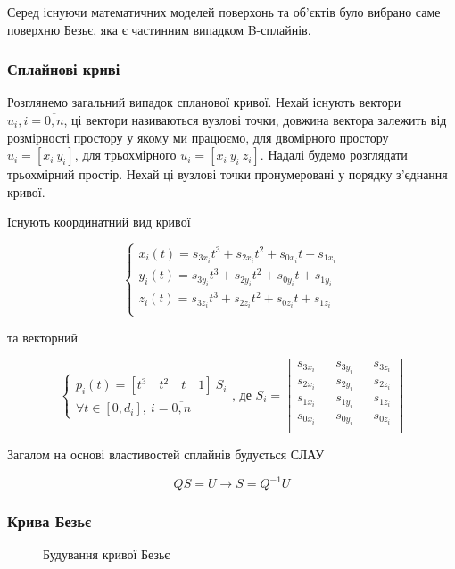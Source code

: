\documentclass[14pt,a4paper]{extarticle}
\theoremstyle{definition}
\renewcommand{\[}{\begin{singlespace}\begin{equation*}}
\renewcommand{\]}{\end{equation*}\end{singlespace}}
\begin{document}
Серед існуючи математичних моделей поверхонь та об'єктів було вибрано саме поверхню Безьє, яка є частинним випадком B-сплайнів.

\subsubsection{Сплайнові криві}

Розглянемо загальний випадок спланової кривої. Нехай існують вектори $u_i, i=\overline{0,n}$, ці вектори називаються вузлові точки, довжина вектора залежить від розмірності простору у якому ми працюємо, для двомірного простору $u_i = [x_i\ y_i]$, для трьохмірного $u_i = [x_i\ y_i\ z_i]$. Надалі будемо розглядати трьохмірний простір. Нехай ці вузлові точки пронумеровані у порядку з'єднання кривої.

Існують координатний вид кривої
\[\left\{\begin{array}{l}
x_i(t)=s_{3x_i}t^3+s_{2x_i}t^2+s_{0x_i}t+s_{1x_i}\\
y_i(t)=s_{3y_i}t^3+s_{2y_i}t^2+s_{0y_i}t+s_{1y_i}\\
z_i(t)=s_{3z_i}t^3+s_{2z_i}t^2+s_{0z_i}t+s_{1z_i}\\
\end{array}\right.\]
та векторний
\[\left\{\begin{array}{l}
p_i(t)=[t^3\quad t^2\quad t\quad 1]\ S_i\\
\forall t \in [0, d_i],\ i = \overline{0,n}
\end{array}\right.\text{, де }S_i=\left[\begin{matrix}
s_{3x_i} && s_{3y_i} && s_{3z_i} \\
s_{2x_i} && s_{2y_i} && s_{2z_i} \\
s_{1x_i} && s_{1y_i} && s_{1z_i} \\
s_{0x_i} && s_{0y_i} && s_{0z_i} \\
\end{matrix}\right]\]

Загалом на основі властивостей сплайнів будується СЛАУ
\[QS=U \to S=Q^{-1}U\]

\subsubsection{Крива Безьє}

\begin{figure}[!htb]
    \centering
    \def\svgwidth{\columnwidth}
    
    \caption{Будування кривої Безьє}\label{fig:bezier_3_big}
\end{figure}
\end{document}
